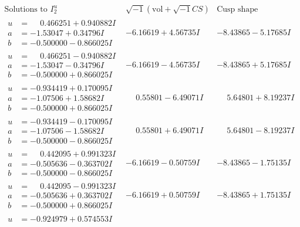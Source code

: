 \documentclass[1p]{elsarticle_modified}
\theoremstyle{definition}
\newcommand{\I}{\sqrt{-1}}
\begin{document}
$$\begin{array}{c|c|c}  
\text{Solutions to }I^u_{2}& \I (\text{vol} + \sqrt{-1}CS) & \text{Cusp shape}\\
 \hline 
\begin{aligned}
u &= \phantom{-}0.466251 + 0.940882 I \\
a &= -1.53047 + 0.34796 I \\
b &= -0.500000 - 0.866025 I\end{aligned}
 & -6.16619 + 4.56735 I & -8.43865 - 5.17685 I \\ \hline\begin{aligned}
u &= \phantom{-}0.466251 - 0.940882 I \\
a &= -1.53047 - 0.34796 I \\
b &= -0.500000 + 0.866025 I\end{aligned}
 & -6.16619 - 4.56735 I & -8.43865 + 5.17685 I \\ \hline\begin{aligned}
u &= -0.934419 + 0.170095 I \\
a &= -1.07506 + 1.58682 I \\
b &= -0.500000 + 0.866025 I\end{aligned}
 & \phantom{-}0.55801 - 6.49071 I & \phantom{-}5.64801 + 8.19237 I \\ \hline\begin{aligned}
u &= -0.934419 - 0.170095 I \\
a &= -1.07506 - 1.58682 I \\
b &= -0.500000 - 0.866025 I\end{aligned}
 & \phantom{-}0.55801 + 6.49071 I & \phantom{-}5.64801 - 8.19237 I \\ \hline\begin{aligned}
u &= \phantom{-}0.442095 + 0.991323 I \\
a &= -0.505636 - 0.363702 I \\
b &= -0.500000 - 0.866025 I\end{aligned}
 & -6.16619 - 0.50759 I & -8.43865 - 1.75135 I \\ \hline\begin{aligned}
u &= \phantom{-}0.442095 - 0.991323 I \\
a &= -0.505636 + 0.363702 I \\
b &= -0.500000 + 0.866025 I\end{aligned}
 & -6.16619 + 0.50759 I & -8.43865 + 1.75135 I \\ \hline\begin{aligned}
u &= -0.924979 + 0.574553 I \\

\end{aligned}
\end{array}$$
\end{document}
